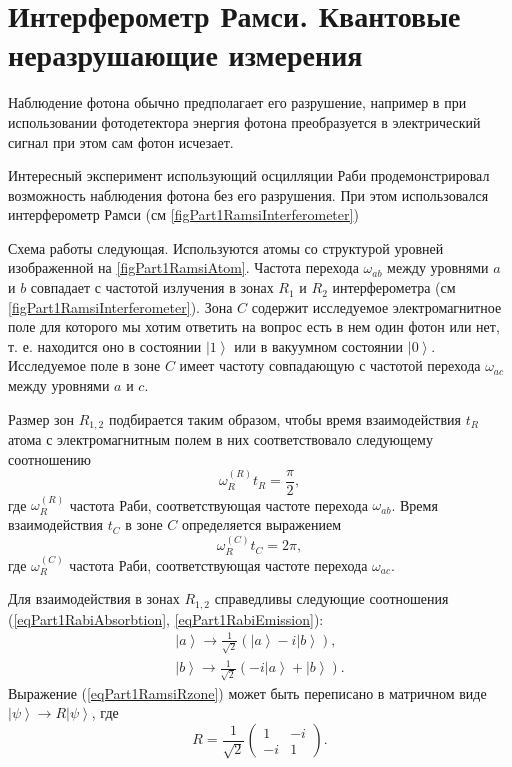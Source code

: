 \section{Интерферометр Рамси. Квантовые неразрушающие измерения}

Наблюдение фотона обычно предполагает его разрушение, например в
при использовании фотодетектора энергия фотона преобразуется в
электрический сигнал при этом сам фотон исчезает.

Интересный эксперимент \cite{Nogues1999Nv400p239} использующий
осцилляции Раби продемонстрировал возможность наблюдения фотона без
его разрушения. При этом использовался интерферометр Рамси (см
\autoref{figPart1RamsiInterferometer})





Схема работы следующая. Используются атомы со структурой уровней
изображенной на \autoref{figPart1RamsiAtom}. Частота перехода
$\omega_{ab}$ между уровнями $a$ и $b$ совпадает с частотой излучения
в зонах $R_1$ и $R_2$ интерферометра  (см
\autoref{figPart1RamsiInterferometer}). Зона $C$ содержит исследуемое
электромагнитное поле для которого мы хотим ответить на вопрос есть в
нем один фотон или нет, т. е. находится оно в состоянии
$\left|1\right>$ или в вакуумном состоянии
$\left|0\right>$. Исследуемое поле в зоне $C$ имеет частоту
совпадающую с частотой перехода $\omega_{ac}$ между уровнями $a$ и
$c$.  

Размер зон $R_{1,2}$ подбирается таким образом, чтобы время
взаимодействия $t_R$ атома с электромагнитным полем в них соответствовало
следующему соотношению
\begin{equation}
  \omega_R^{(R)} t_R = \frac{\pi}{2},
  \nonumber
\end{equation}
где $\omega_R^{(R)}$ частота Раби, соответствующая частоте перехода
$\omega_{ab}$.
Время взаимодействия $t_C$ в зоне $C$ определяется выражением
\begin{equation}
  \omega_R^{(C)} t_C = 2 \pi,
  \nonumber
\end{equation}
где $\omega_R^{(C)}$ частота Раби, соответствующая частоте перехода
$\omega_{ac}$.

Для взаимодействия в зонах $R_{1,2}$ справедливы следующие
соотношения (\ref{eqPart1RabiAbsorbtion}, \ref{eqPart1RabiEmission}):
\begin{eqnarray}
  \left|a\right> \rightarrow \frac{1}{\sqrt{2}}\left(
  \left|a\right> - i \left|b\right>  
  \right),
  \nonumber \\
  \left|b\right> \rightarrow \frac{1}{\sqrt{2}}\left(
  -i \left|a\right> + \left|b\right>  
  \right).
  \label{eqPart1RamsiRzone}
\end{eqnarray}
Выражение (\ref{eqPart1RamsiRzone}) может быть переписано в матричном
виде $\left|\psi\right> \rightarrow R \left|\psi\right>$,
где
\[
R = \frac{1}{\sqrt{2}} \left(
\begin{array} {cc}
1 & -i
\\
-i & 1 
\end{array}
\right).
\]

